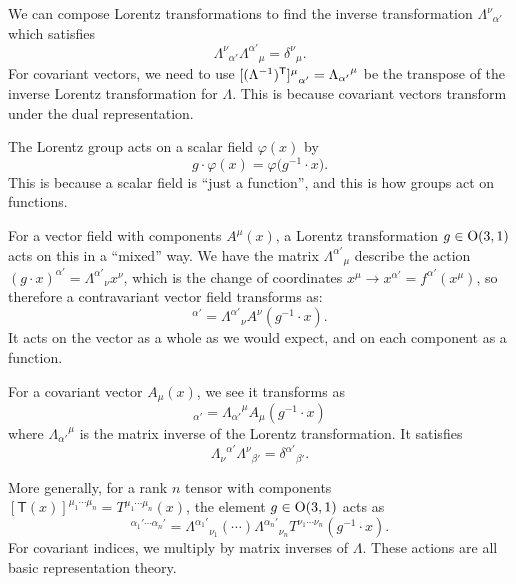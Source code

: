 We can compose Lorentz transformations to find the inverse
transformation ${\Lambda^{\nu}}_{\alpha'}$ which satisfies
\begin{equation}
{\Lambda^{\nu}}_{\alpha'}{\Lambda^{\alpha'}}_{\mu}={\delta^{\nu}}_{\mu}.
\end{equation}
For covariant vectors, we need to use
${[(\Lambda^{-1})^{\mathsf{T}}]^{\mu}}_{\alpha'} = {\Lambda_{\alpha'}}^{\mu}$
be the transpose of the inverse Lorentz transformation for $\Lambda$.
This is because covariant vectors transform under the dual
representation. 


\M
The Lorentz group acts on a scalar field $\varphi(x)$ by
\begin{equation}
g\cdot\varphi(x) = \varphi\bigl(g^{-1}\cdot x\bigr).
\end{equation}
This is because a scalar field is ``just a function'', and this is how
groups act on functions.

For a vector field with components $A^{\mu}(x)$, a Lorentz
transformation $g\in\mathrm{O}(3,1)$ acts on this in a ``mixed'' way. We have
the matrix ${\Lambda^{\alpha'}}_{\mu}$ describe the action $(g\cdot x)^{\alpha'} = {\Lambda^{\alpha'}}_{\nu}x^{\nu}$,
which is the change of coordinates $x^{\mu}\to x^{\alpha'}=f^{\alpha'}(x^{\mu})$,
so therefore a contravariant vector field transforms as:
\begin{equation}
[(g\cdot \vec{A})(x)]^{\alpha'} = {\Lambda^{\alpha'}}_{\nu}A^{\nu}(g^{-1}\cdot x).
\end{equation}
It acts on the vector as a whole as we would expect, and on each
component as a function.

For a covariant vector $A_{\mu}(x)$, we see it transforms as
\begin{equation}
[(g\cdot \vec{A})(x)]_{\alpha'} = {\Lambda_{\alpha'}}^{\mu}A_{\mu}(g^{-1}\cdot x)
\end{equation}
where ${\Lambda_{\alpha'}}^{\mu}$ is the matrix inverse of the Lorentz
transformation. It satisfies
\begin{equation}
{\Lambda_{\nu}}^{\alpha'}{\Lambda^{\nu}}_{\beta'} = {\delta^{\alpha'}}_{\beta'}.
\end{equation}

More generally, for a rank $n$ tensor with components $[\mathsf{T}(x)]^{\mu_{1}\cdots\mu_{n}}=T^{\mu_{1}\cdots\mu_{n}}(x)$,
the element $g\in\mathrm{O}(3,1)$ acts as
\begin{equation}
[(g\cdot \tens{T})(x)]^{\alpha_{1}'\cdots\alpha_{n}'}
= {\Lambda^{\alpha_{1}'}}_{\nu_{1}}(\cdots){\Lambda^{\alpha_{n}'}}_{\nu_{n}}
T^{\nu_{1}\cdots\nu_{n}}(g^{-1}\cdot x).
\end{equation}
For covariant indices, we multiply by matrix inverses of $\Lambda$.
These actions are all basic representation theory.

